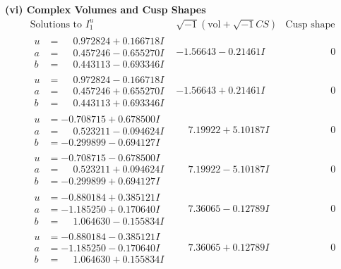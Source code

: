 \documentclass[1p]{elsarticle_modified}
\theoremstyle{definition}
\newcommand{\I}{\sqrt{-1}}
\begin{document}
\newpage\flushleft \textbf{(vi) Complex Volumes and Cusp Shapes}
$$\begin{array}{c|c|c}  
\text{Solutions to }I^u_{1}& \I (\text{vol} + \sqrt{-1}CS) & \text{Cusp shape}\\
 \hline 
\begin{aligned}
u &= \phantom{-}0.972824 + 0.166718 I \\
a &= \phantom{-}0.457246 - 0.655270 I \\
b &= \phantom{-}0.443113 - 0.693346 I\end{aligned}
 & -1.56643 - 0.21461 I & \phantom{-0.000000 } 0 \\ \hline\begin{aligned}
u &= \phantom{-}0.972824 - 0.166718 I \\
a &= \phantom{-}0.457246 + 0.655270 I \\
b &= \phantom{-}0.443113 + 0.693346 I\end{aligned}
 & -1.56643 + 0.21461 I & \phantom{-0.000000 } 0 \\ \hline\begin{aligned}
u &= -0.708715 + 0.678500 I \\
a &= \phantom{-}0.523211 - 0.094624 I \\
b &= -0.299899 - 0.694127 I\end{aligned}
 & \phantom{-}7.19922 + 5.10187 I & \phantom{-0.000000 } 0 \\ \hline\begin{aligned}
u &= -0.708715 - 0.678500 I \\
a &= \phantom{-}0.523211 + 0.094624 I \\
b &= -0.299899 + 0.694127 I\end{aligned}
 & \phantom{-}7.19922 - 5.10187 I & \phantom{-0.000000 } 0 \\ \hline\begin{aligned}
u &= -0.880184 + 0.385121 I \\
a &= -1.185250 + 0.170640 I \\
b &= \phantom{-}1.064630 - 0.155834 I\end{aligned}
 & \phantom{-}7.36065 - 0.12789 I & \phantom{-0.000000 } 0 \\ \hline\begin{aligned}
u &= -0.880184 - 0.385121 I \\
a &= -1.185250 - 0.170640 I \\
b &= \phantom{-}1.064630 + 0.155834 I\end{aligned}
 & \phantom{-}7.36065 + 0.12789 I & \phantom{-0.000000 } 0 \\ \hline\begin{aligned}

\end{aligned}
\end{array}$$
\end{document}

